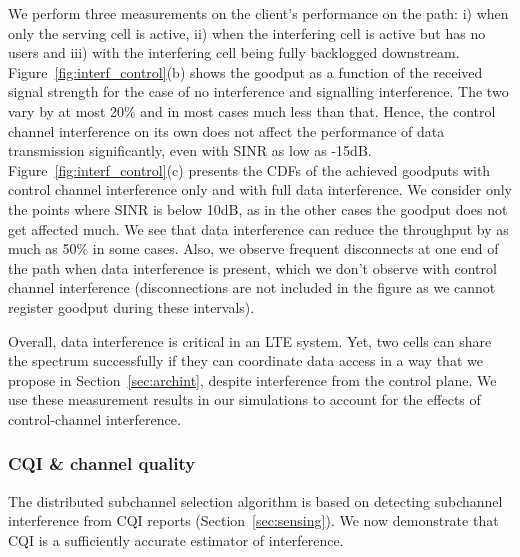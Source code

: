 We perform three measurements on the client's performance on the path: i) when only the serving cell is active, ii) when the interfering cell is active but has no users and iii) with the interfering cell being 
fully backlogged downstream. 
Figure~\ref{fig:interf_control}(b) shows the goodput as a function of the received signal strength for the case of no interference and signalling interference. The two vary by at most 20\% and in most cases much less than that. 
Hence, the control channel interference on its own does not affect the performance of data transmission significantly, even with SINR as low as -15dB. 
Figure~\ref{fig:interf_control}(c) presents the CDFs of the achieved goodputs with control channel interference only and with full data interference. 
We consider only the points where SINR is below 10dB, as in the other cases the goodput does not get affected much. We see that data interference can reduce the throughput by as much as 50\% in some cases. 
Also, we observe frequent disconnects at one end of the path when data interference is present, which we don't observe with control channel interference 
(disconnections are not included in the figure as we cannot register goodput during these intervals). 

Overall, data interference is critical in an LTE system.
Yet, two cells can share the spectrum successfully if they can coordinate data access in a way that we propose in Section~\ref{sec:archint}, despite interference from the control plane. 
We use these measurement results in our simulations to account for the effects of control-channel interference. 




\subsubsection{CQI \& channel quality}
\label{sec:eval_cqi}

The distributed subchannel selection algorithm is based on detecting subchannel interference from CQI reports (Section~\ref{sec:sensing}). 
We now demonstrate that CQI is a sufficiently accurate estimator of interference. 

